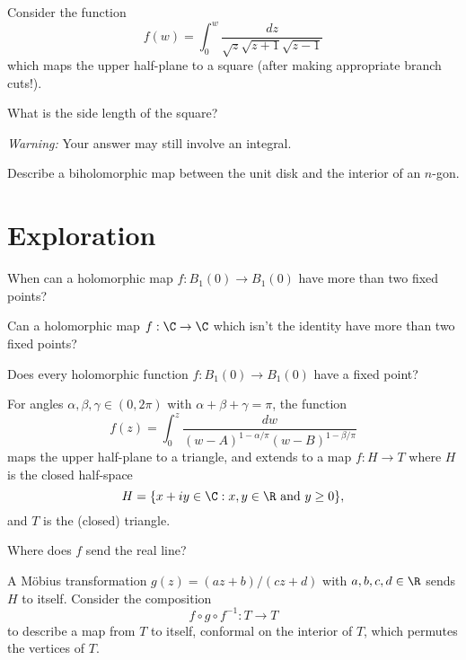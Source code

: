 \documentclass{homework}
\begin{document}
\begin{problem}
  Consider the function
  \[
    f(w) = \int_0^w  \frac{dz}{\sqrt{z} \sqrt{z+1} \sqrt{z-1}}
  \]
  which maps the upper half-plane to a square (after making appropriate branch cuts!).

  What is the side length of the square?

  \textit{Warning:} Your answer may still involve an integral.
\end{problem}

\begin{problem}
  Describe a biholomorphic map between the unit disk and the interior
  of an $n$-gon.
\end{problem}

\section{Exploration}

\begin{problem}  
  When can a holomorphic map $f : B_1(0) \to B_1(0)$ have more than two fixed points?
\end{problem}

\begin{problem}
  Can a holomorphic map $f : \C \to \C$ which isn't the identity have
  more than two fixed points?
\end{problem}

\begin{problem}
  Does every holomorphic function $f : B_1(0) \to B_1(0)$ have a fixed point?
\end{problem}

\begin{problem}
  For angles $\alpha, \beta, \gamma \in (0,2\pi)$ with $\alpha + \beta + \gamma = \pi$, the function
  \[
    f(z) = \int_0^z \frac{dw}{(w-A)^{1-\alpha/\pi} (w-B)^{1-\beta/\pi}}
  \]
  maps the upper half-plane to a triangle, and extends to a map $f : H \to T$ where $H$ is the closed half-space
  \[
    H = \{ x + iy \in \C : x, y \in \R \mbox{ and } y \geq 0 \},
  \]
  and $T$ is the (closed) triangle.

  Where does $f$ send the real line?
\end{problem}

\begin{problem}
  A M\"obius transformation $g(z) = (az + b)/(cz + d)$ with
  $a,b,c,d \in \R$ sends $H$ to itself.  Consider the composition
  \[
    f \circ g \circ f^{-1} : T \to T
  \]
  to describe a map from $T$ to itself, conformal on the interior of
  $T$, which permutes the vertices of $T$.
\end{problem}
\end{document}
